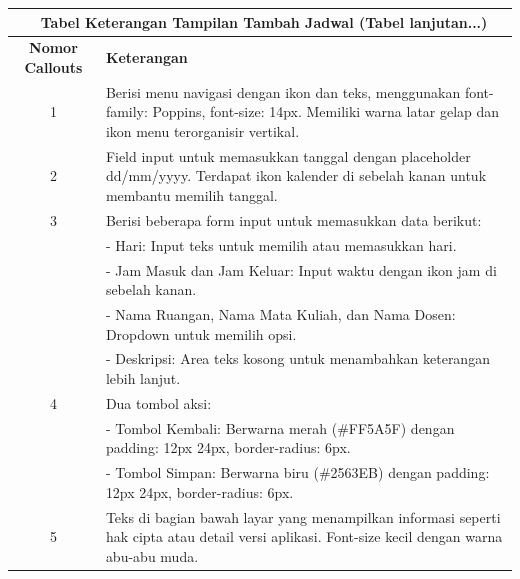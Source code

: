 \begin{enumerate}
{\begin{longtable}{c p{}}
		      \multicolumn{2}{c}{\selectfont \thetable\ {Tabel Keterangan Tampilan Tambah Jadwal} \space (Tabel lanjutan...)}                                                                         \\
		      \hline
		      \textbf{Nomor Callouts} & \textbf{Keterangan}                                                                                                                                           \\
		      \hline
		      \endhead

		      1                       & Berisi menu navigasi dengan ikon dan teks, menggunakan font-family: Poppins, font-size: 14px. Memiliki warna latar gelap dan ikon menu terorganisir vertikal. \\
		      2                       & Field input untuk memasukkan tanggal dengan placeholder dd/mm/yyyy. Terdapat ikon kalender di sebelah kanan untuk membantu memilih tanggal.                   \\
		      3                       & Berisi beberapa form input untuk memasukkan data berikut:                                                                                                     \\
		                              & - Hari: Input teks untuk memilih atau memasukkan hari.                                                                                                        \\
		                              & - Jam Masuk dan Jam Keluar: Input waktu dengan ikon jam di sebelah kanan.                                                                                     \\
		                              & - Nama Ruangan, Nama Mata Kuliah, dan Nama Dosen: Dropdown untuk memilih opsi.                                                                                \\
		                              & - Deskripsi: Area teks kosong untuk menambahkan keterangan lebih lanjut.                                                                                      \\
		      4                       & Dua tombol aksi:                                                                                                                                              \\
		                              & - Tombol Kembali: Berwarna merah (\#FF5A5F) dengan padding: 12px 24px, border-radius: 6px.                                                                    \\
		                              & - Tombol Simpan: Berwarna biru (\#2563EB) dengan padding: 12px 24px, border-radius: 6px.                                                                      \\
		      5                       & Teks di bagian bawah layar yang menampilkan informasi seperti hak cipta atau detail versi aplikasi. Font-size kecil dengan warna abu-abu muda.                \\
		      \hline
	      \end{longtable}
	      }


\end{enumerate}
